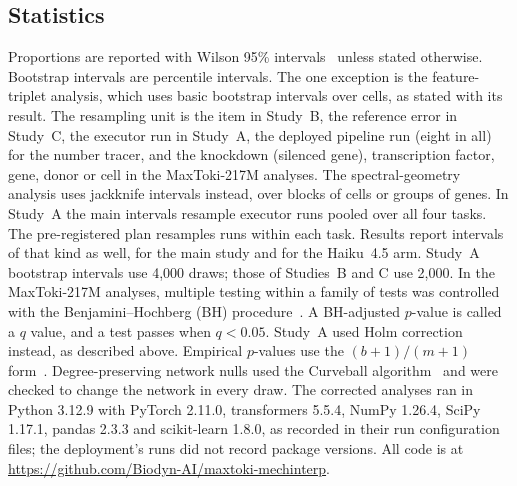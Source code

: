\documentclass[10pt,letterpaper]{article}
\begin{document}
\subsection*{Statistics}
Proportions are reported with Wilson 95\% intervals~\cite{wilson1927probable}
unless stated otherwise. Bootstrap intervals are percentile intervals.
The one exception is the feature-triplet analysis, which uses basic
bootstrap intervals over cells, as stated with its result. The resampling
unit is the item in Study~B, the reference error in Study~C, the executor run in Study~A, the
deployed pipeline run (eight in all) for the number tracer, and the knockdown
(silenced gene), transcription factor, gene, donor or cell in the
MaxToki-217M analyses. The spectral-geometry analysis uses jackknife
intervals instead, over blocks of cells or groups of genes. In Study~A
the main intervals resample executor runs pooled over all four tasks. The
pre-registered plan resamples runs within each task. Results report
intervals of that kind as well, for the main study and for the Haiku~4.5
arm. Study~A bootstrap intervals use 4,000 draws; those of Studies~B and
C use 2,000. In the MaxToki-217M analyses, multiple testing within a
family of tests was controlled with the Benjamini--Hochberg (BH)
procedure~\cite{benjamini1995fdr}. A BH-adjusted $p$-value is called a
$q$ value, and a test passes when $q < 0.05$. Study~A used Holm
correction instead, as described above. Empirical $p$-values use the
$(b+1)/(m+1)$ form~\cite{phipson2010permp}. Degree-preserving network
nulls used the Curveball algorithm~\cite{strona2014curveball} and were
checked to change the network in every draw. The corrected analyses ran
in Python 3.12.9 with PyTorch 2.11.0, transformers 5.5.4, NumPy 1.26.4,
SciPy 1.17.1, pandas 2.3.3 and scikit-learn 1.8.0, as recorded in their
run configuration files; the deployment's runs did not record package
versions. All code is at
\url{https://github.com/Biodyn-AI/maxtoki-mechinterp}.
\end{document}
